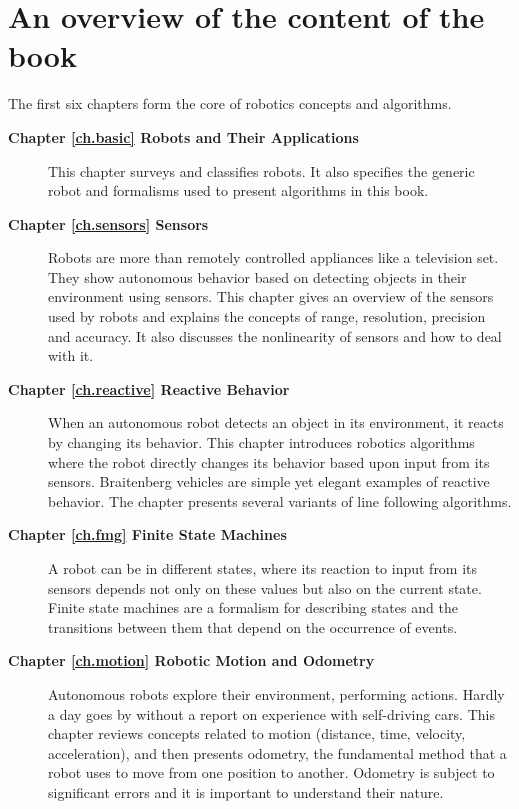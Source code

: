 \section{An overview of the content of the book}\label{s.overview}

The first six chapters form the core of robotics concepts and algorithms.
\begin{description}
\item [\textbf{Chapter \ref{ch.basic} Robots and Their Applications}] This chapter surveys and classifies robots. It also specifies the generic robot and formalisms used to present algorithms in this book.
\smallskip
\item [\textbf{Chapter \ref{ch.sensors} Sensors}] Robots are more than remotely controlled appliances like a television set. They show autonomous behavior based on detecting objects in their environment using sensors. This chapter gives an overview of the sensors used by robots and explains the concepts of range, resolution, precision and accuracy. It also discusses the nonlinearity of sensors and how to deal with it.
\smallskip
\item [\textbf{Chapter \ref{ch.reactive} Reactive Behavior}] When an autonomous robot detects an object in its environment, it reacts by changing its behavior. This chapter introduces robotics algorithms where the robot directly changes its behavior based upon input from its sensors. Braitenberg vehicles are simple yet elegant examples of reactive behavior. The chapter presents several variants of line following algorithms.
\smallskip
\item [\textbf{Chapter \ref{ch.fmg} Finite State Machines}] A robot can be in different states, where its reaction to input from its sensors depends not only on these values but also on the current state. Finite state machines are a formalism for describing states and the transitions between them that depend on the occurrence of events.
\smallskip
\item [\textbf{Chapter \ref{ch.motion} Robotic Motion and Odometry}] Autonomous robots explore their environment, performing actions. Hardly a day goes by without a report on experience with self-driving cars. This chapter reviews concepts related to motion (distance, time, velocity, acceleration), and then presents odometry, the fundamental method that a robot uses to move from one position to another. Odometry is subject to significant errors and it is important to understand their nature.


\end{description}
